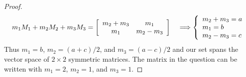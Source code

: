 \documentclass{tutorial}
\begin{document}
\begin{proof}
\[
  m_1M_1 + m_2M_2 + m_3M_3 = \left[ \begin{array}{cc}
    m_2 + m_3 & m_1 \\
    m_1 & m_2 - m_3
  \end{array} \right]
  \hspace{0.15in} \Longrightarrow
  \left\{ \begin{array}{l}
    m_2 + m_3 = a \\
    m_1 = b \\
    m_2 - m_3 = c \\
  \end{array} \right.
\]
Thus $m_1 = b$, $m_2 = (a+c)/2$, and $m_3 = (a-c)/2$ and our set spans the vector space of $2 \times 2$ symmetric matrices. The matrix in the question can be written with $m_1 = 2$, $m_2 = 1$, and $m_3 = 1$.
\end{proof}\else \vspace{3in} \fi
\end{document}
